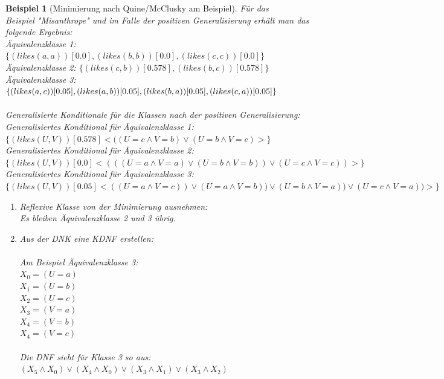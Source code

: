 \documentclass[a4paper, 11pt]{book}
\newtheorem{Bsp}{Beispiel}[section]
\begin{document}
\begin{Bsp}[Minimierung nach Quine/McClusky am Beispiel]
	Für das \\ Beispiel "{}Misanthrope"{} und im Falle der positiven Generalisierung erhält man das folgende Ergebnis:\\
	Äquivalenzklasse 1: $ \{(likes(a,a))[0.0], (likes(b,b))[0.0], (likes(c,c))[0.0]\} $\\
	Äquivalenzklasse 2: $ \{(likes(c,b))[0.578], (likes(b,c))[0.578]\} $\\
	Äquivalenzklasse 3: $ \{(likes(a,c))[0.05], (likes(a,b))[0.05], (likes(b,a))[0.05],\\ (likes(c,a))[0.05]\} $\\
	\\
	\noindent
	Generalisierte Konditionale für die Klassen nach der positiven Generalisierung:\\
	Generalisiertes Konditional für Äquivalenzklasse 1: $ \{(likes(U,V))[0.578] <((U = c \land V = b) \lor (U = b \land V = c)>\} $\\
	Generalisiertes Konditional für Äquivalenzklasse 2: $ \{(likes(U,V))[0.0] <(((U = a \land V = a) \lor (U = b \land V = b)) \lor (U = c \land V = c)) >\} $\\
	Generalisiertes Konditional für Äquivalenzklasse 3: $ \{(likes(U,V))[0.05] <((U = a \land V = c)) \lor (U = a \land V = b)) \lor (U = b \land V = a)) \lor (U = c \land V = a))>\} $\\
	\begin{enumerate}
		\item Reflexive Klasse von der Minimierung ausnehmen:\\
		Es bleiben Äquivalenzklasse 2 und 3 übrig.	
		\item Aus der DNK eine KDNF erstellen:\\\\
		Am Beispiel Äquivalenzklasse 3:\\
		$ X_0 = (U = a) $\\
		$ X_1 = (U = b) $\\
		$ X_2 = (U = c) $\\
		$ X_3 = (V = a) $\\
		$ X_4 = (V = b) $\\
		$ X_4 = (V = c) $\\
		\\
		\noindent
		Die DNF sieht für Klasse 3 so aus:\\
		$ (X_5 \land X_0) \lor (X_4 \land X_0) \lor (X_3 \land X_1) \lor (X_3 \land X_2) $
		\begin{footnotesize}

\end{footnotesize}
\end{enumerate}
\end{Bsp}
\end{document}
